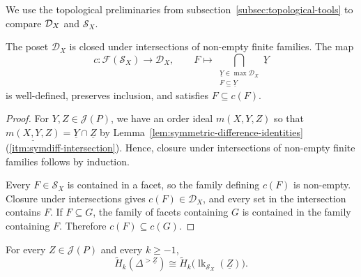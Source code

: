 \documentclass[a4paper,leqno]{amsart}
\begin{document}
We use the topological preliminaries from subsection~\ref{subsec:topological-tools} to compare $\mathcal D_X$ and $\mathcal S_X$.

\begin{lem}\label{lem:face closure map}
The poset $\mathcal D_X$ is closed under intersections of non-empty finite families. The map
\[
c:\mathcal F(\mathcal S_X)\longrightarrow\mathcal D_X,\qquad
F\longmapsto\bigcap_{\substack{\underline{Y}\in\max\mathcal D_X\\F\subseteq \underline{Y}}}\underline{Y}
\]
is well-defined, preserves inclusion, and satisfies $F\subseteq c(F)$.
\end{lem}

\begin{proof}
For $Y,Z\in\mathcal{J}(P)$, we have an order ideal $m(X,Y,Z)$ so that $\underline{m(X,Y,Z)} = \underline{Y}\cap \underline{Z}$ by Lemma~\ref{lem:symmetric-difference-identities}\textup{(\ref{itm:symdiff-intersection})}. Hence, closure under intersections of non-empty finite families follows by induction.

Every $F\in\mathcal S_X$ is contained in a facet, so the family defining $c(F)$ is non-empty. Closure under intersections gives $c(F)\in\mathcal D_X$, and every set in the intersection contains $F$. If $F\subseteq G$, the family of facets containing $G$ is contained in the family containing $F$. Therefore $c(F)\subseteq c(G)$.
\end{proof}

\begin{lem}\label{lem:H(Delta Z)=H(lk DZ)}
For every $Z\in\mathcal J(P)$ and every $k\geq-1$,
\[
\widetilde H_k(\Delta^{>\underline{Z}})\cong
\widetilde H_k\bigl(\operatorname{lk}_{\mathcal S_X}(\underline{Z})\bigr).
\]
\end{lem}
\end{document}
